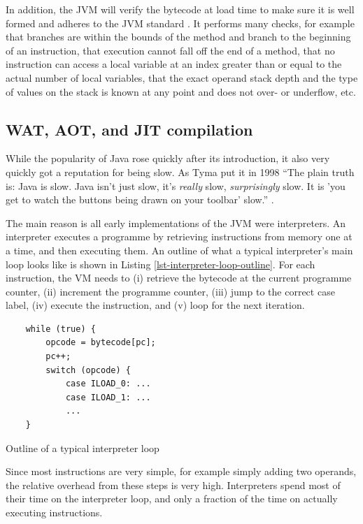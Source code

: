 In addition, the JVM will verify the bytecode at load time to make sure it is well formed and adheres to the JVM standard \cite{Lindholm:2017vu}. It performs many checks, for example that branches are within the bounds of the method and branch to the beginning of an instruction, that execution cannot fall off the end of a method, that no instruction can access a local variable at an index greater than or equal to the actual number of local variables, that the exact operand stack depth and the type of values on the stack is known at any point and does not over- or underflow, etc.

\subsection{WAT, AOT, and JIT compilation}
While the popularity of Java rose quickly after its introduction, it also very quickly got a reputation for being slow. As Tyma put it in 1998 “The plain truth is: Java is slow. Java isn't just slow, it's \emph{really} slow, \emph{surprisingly} slow. It is 'you get to watch the buttons being drawn on your toolbar' slow.” \cite{Tyma:1998vj}.

The main reason is all early implementations of the JVM were interpreters. An interpreter executes a programme by retrieving instructions from memory one at a time, and then executing them. An outline of what a typical interpreter's main loop looks like is shown in Listing \ref{lst-interpreter-loop-outline}. For each instruction, the VM needs to (i) retrieve the bytecode at the current programme counter, (ii) increment the programme counter, (iii) jump to the correct case label, (iv) execute the instruction, and (v) loop for the next iteration.

\begin{listing}
    \centering
    \begin{verbatim}
    while (true) {
        opcode = bytecode[pc];
        pc++;
        switch (opcode) {
            case ILOAD_0: ...
            case ILOAD_1: ...
            ...
    }
    \end{verbatim}
\caption{Outline of a typical interpreter loop}
\label{lst-interpreter-loop-outline}
\end{listing}

Since most instructions are very simple, for example simply adding two operands, the relative overhead from these steps is very high. Interpreters spend most of their time on the interpreter loop, and only a fraction of the time on actually executing instructions.

